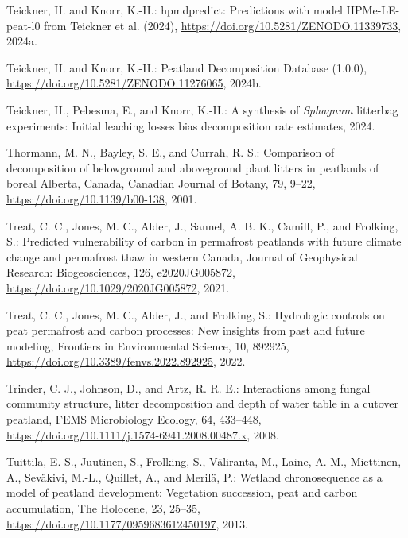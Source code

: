 \documentclass[
  12pt,
]{article}
\newlength{\cslhangindent}
\newlength{\cslentryspacingunit} %
\newenvironment{CSLReferences}[2] %
 {%
  \setlength{\parindent}{0pt}
  \ifodd #1
  \let\oldpar\par
  \def\par{\hangindent=\cslhangindent\oldpar}
  \fi
  \setlength{\parskip}{#2\cslentryspacingunit}
 }%
 {}
\begin{document}
\begin{CSLReferences}{0}{0}
\leavevmode{}%
Teickner, H. and Knorr, K.-H.: {hpmdpredict}: {Predictions} with model {HPMe-LE-peat-l0} from {Teickner} et al. (2024), \url{https://doi.org/10.5281/ZENODO.11339733}, 2024a.

\leavevmode{}%
Teickner, H. and Knorr, K.-H.: Peatland {Decomposition Database} (1.0.0), \url{https://doi.org/10.5281/ZENODO.11276065}, 2024b.

\leavevmode{}%
Teickner, H., Pebesma, E., and Knorr, K.-H.: A synthesis of {\emph{Sphagnum}} litterbag experiments: {Initial} leaching losses bias decomposition rate estimates, 2024.

\leavevmode{}%
Thormann, M. N., Bayley, S. E., and Currah, R. S.: Comparison of decomposition of belowground and aboveground plant litters in peatlands of boreal {Alberta}, {Canada}, Canadian Journal of Botany, 79, 9--22, \url{https://doi.org/10.1139/b00-138}, 2001.

\leavevmode{}%
Treat, C. C., Jones, M. C., Alder, J., Sannel, A. B. K., Camill, P., and Frolking, S.: Predicted vulnerability of carbon in permafrost peatlands with future climate change and permafrost thaw in western {Canada}, Journal of Geophysical Research: Biogeosciences, 126, e2020JG005872, \url{https://doi.org/10.1029/2020JG005872}, 2021.

\leavevmode{}%
Treat, C. C., Jones, M. C., Alder, J., and Frolking, S.: Hydrologic controls on peat permafrost and carbon processes: {New} insights from past and future modeling, Frontiers in Environmental Science, 10, 892925, \url{https://doi.org/10.3389/fenvs.2022.892925}, 2022.

\leavevmode{}%
Trinder, C. J., Johnson, D., and Artz, R. R. E.: Interactions among fungal community structure, litter decomposition and depth of water table in a cutover peatland, FEMS Microbiology Ecology, 64, 433--448, \url{https://doi.org/10.1111/j.1574-6941.2008.00487.x}, 2008.

\leavevmode{}%
Tuittila, E.-S., Juutinen, S., Frolking, S., Väliranta, M., Laine, A. M., Miettinen, A., Seväkivi, M.-L., Quillet, A., and Merilä, P.: Wetland chronosequence as a model of peatland development: {Vegetation} succession, peat and carbon accumulation, The Holocene, 23, 25--35, \url{https://doi.org/10.1177/0959683612450197}, 2013.


\end{CSLReferences}
\end{document}

